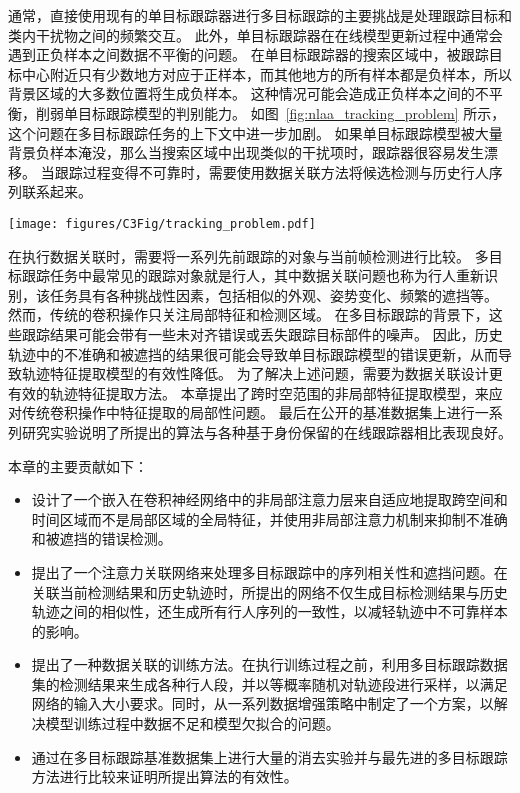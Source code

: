 通常，直接使用现有的单目标跟踪器进行多目标跟踪的主要挑战是处理跟踪目标和类内干扰物之间的频繁交互。
此外，单目标跟踪器在在线模型更新过程中通常会遇到正负样本之间数据不平衡的问题。
在单目标跟踪器的搜索区域中，被跟踪目标中心附近只有少数地方对应于正样本，而其他地方的所有样本都是负样本，所以背景区域的大多数位置将生成负样本。
这种情况可能会造成正负样本之间的不平衡，削弱单目标跟踪模型的判别能力。
如图~\ref{fig:nlaa_tracking_problem} 所示，这个问题在多目标跟踪任务的上下文中进一步加剧。
如果单目标跟踪模型被大量背景负样本淹没，那么当搜索区域中出现类似的干扰项时，跟踪器很容易发生漂移。
当跟踪过程变得不可靠时，需要使用数据关联方法将候选检测与历史行人序列联系起来。


\begin{figure*}[ht]
	\centering
	\texttt{[image: figures/C3Fig/tracking\_problem.pdf]}
	\caption{数据关联的动机}
	\label{fig:nlaa_tracking_problem}
\end{figure*}

在执行数据关联时，需要将一系列先前跟踪的对象与当前帧检测进行比较。 
多目标跟踪任务中最常见的跟踪对象就是行人，其中数据关联问题也称为行人重新识别，该任务具有各种挑战性因素，包括相似的外观、姿势变化、频繁的遮挡等。
然而，传统的卷积操作只关注局部特征和检测区域。
在多目标跟踪的背景下，这些跟踪结果可能会带有一些未对齐错误或丢失跟踪目标部件的噪声。
因此，历史轨迹中的不准确和被遮挡的结果很可能会导致单目标跟踪模型的错误更新，从而导致轨迹特征提取模型的有效性降低。
为了解决上述问题，需要为数据关联设计更有效的轨迹特征提取方法。
本章提出了跨时空范围的非局部特征提取模型，来应对传统卷积操作中特征提取的局部性问题。
%
最后在公开的基准数据集上进行一系列研究实验说明了所提出的算法与各种基于身份保留的在线跟踪器相比表现良好。

本章的主要贡献如下：
\begin{itemize}
	\item  设计了一个嵌入在卷积神经网络中的非局部注意力层来自适应地提取跨空间和时间区域而不是局部区域的全局特征，并使用非局部注意力机制来抑制不准确和被遮挡的错误检测。
	\item  提出了一个注意力关联网络来处理多目标跟踪中的序列相关性和遮挡问题。在关联当前检测结果和历史轨迹时，所提出的网络不仅生成目标检测结果与历史轨迹之间的相似性，还生成所有行人序列的一致性，以减轻轨迹中不可靠样本的影响。
	\item  提出了一种数据关联的训练方法。在执行训练过程之前，利用多目标跟踪数据集的检测结果来生成各种行人段，并以等概率随机对轨迹段进行采样，以满足网络的输入大小要求。同时，从一系列数据增强策略中制定了一个方案，以解决模型训练过程中数据不足和模型欠拟合的问题。
	\item  通过在多目标跟踪基准数据集上进行大量的消去实验并与最先进的多目标跟踪方法进行比较来证明所提出算法的有效性。
\end{itemize}


